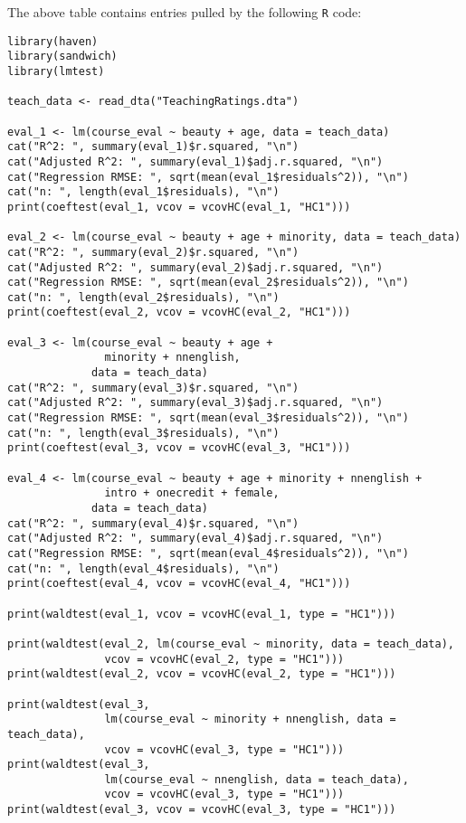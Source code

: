 \documentclass[12pt,letterpaper]{article}
\theoremstyle{definition}
\begin{document}
The above table contains entries pulled by the following \verb|R| code:
\begin{Verbatim}[fontsize=\small]
library(haven)
library(sandwich)
library(lmtest)

teach_data <- read_dta("TeachingRatings.dta")

eval_1 <- lm(course_eval ~ beauty + age, data = teach_data)
cat("R^2: ", summary(eval_1)$r.squared, "\n")
cat("Adjusted R^2: ", summary(eval_1)$adj.r.squared, "\n")
cat("Regression RMSE: ", sqrt(mean(eval_1$residuals^2)), "\n")
cat("n: ", length(eval_1$residuals), "\n")
print(coeftest(eval_1, vcov = vcovHC(eval_1, "HC1")))

eval_2 <- lm(course_eval ~ beauty + age + minority, data = teach_data)
cat("R^2: ", summary(eval_2)$r.squared, "\n")
cat("Adjusted R^2: ", summary(eval_2)$adj.r.squared, "\n")
cat("Regression RMSE: ", sqrt(mean(eval_2$residuals^2)), "\n")
cat("n: ", length(eval_2$residuals), "\n")
print(coeftest(eval_2, vcov = vcovHC(eval_2, "HC1")))

eval_3 <- lm(course_eval ~ beauty + age +
               minority + nnenglish,
             data = teach_data)
cat("R^2: ", summary(eval_3)$r.squared, "\n")
cat("Adjusted R^2: ", summary(eval_3)$adj.r.squared, "\n")
cat("Regression RMSE: ", sqrt(mean(eval_3$residuals^2)), "\n")
cat("n: ", length(eval_3$residuals), "\n")
print(coeftest(eval_3, vcov = vcovHC(eval_3, "HC1")))

eval_4 <- lm(course_eval ~ beauty + age + minority + nnenglish +
               intro + onecredit + female,
             data = teach_data)
cat("R^2: ", summary(eval_4)$r.squared, "\n")
cat("Adjusted R^2: ", summary(eval_4)$adj.r.squared, "\n")
cat("Regression RMSE: ", sqrt(mean(eval_4$residuals^2)), "\n")
cat("n: ", length(eval_4$residuals), "\n")
print(coeftest(eval_4, vcov = vcovHC(eval_4, "HC1")))

print(waldtest(eval_1, vcov = vcovHC(eval_1, type = "HC1")))

print(waldtest(eval_2, lm(course_eval ~ minority, data = teach_data),
               vcov = vcovHC(eval_2, type = "HC1")))
print(waldtest(eval_2, vcov = vcovHC(eval_2, type = "HC1")))

print(waldtest(eval_3,
               lm(course_eval ~ minority + nnenglish, data = teach_data),
               vcov = vcovHC(eval_3, type = "HC1")))
print(waldtest(eval_3,
               lm(course_eval ~ nnenglish, data = teach_data),
               vcov = vcovHC(eval_3, type = "HC1")))
print(waldtest(eval_3, vcov = vcovHC(eval_3, type = "HC1")))


\end{Verbatim}
\end{document}
